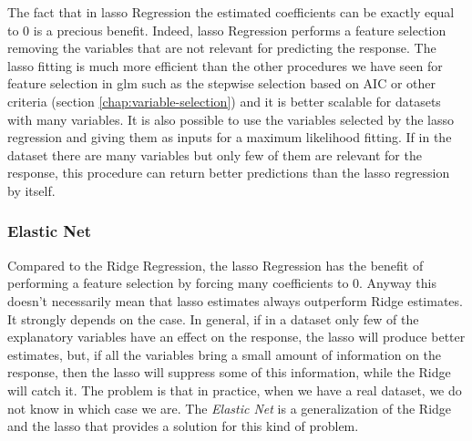 \documentclass[a4paper, twoside, openright, 12pt]{report}
\let\origfigure\figure
\let\endorigfigure\endfigure
\renewenvironment{figure}[1][2] {
  \expandafter\origfigure\expandafter[!hbtp]
} {
  \endorigfigure
}
\theoremstyle{definition}
\theoremstyle{definition}
\theoremstyle{definition}
\theoremstyle{remark}
\begin{document}
\begin{figure}[!hbtp]

{\centering {}

}

\caption[Geometrical interpretation of the optimization problem for Ridge and LASSO.]{Geometrical interpretation of the optimization problem for Ridge and LASSO. The sharpness of the LASSO feasibility region implies that the optimal point \(\hat{\boldsymbol{\beta}}^{LASSO}\) could fall into one of the corners of the square leading one of the coefficients \(\hat{\beta}_j^{LASSO}\) to be exactly equal to \(0\).}\label{fig:opt-ridge-lasso}
\end{figure}

The fact that in \ac{lasso} Regression the estimated coefficients can be exactly equal to \(0\) is a precious benefit. Indeed, \ac{lasso} Regression performs a feature selection removing the variables that are not relevant for predicting the response. The \ac{lasso} fitting is much more efficient than the other procedures we have seen for feature selection in \ac{glm} such as the stepwise selection based on AIC or other criteria (section \ref{chap:variable-selection}) and it is better scalable for datasets with many variables. It is also possible to use the variables selected by the \ac{lasso} regression and giving them as inputs for a maximum likelihood fitting. If in the dataset there are many variables but only few of them are relevant for the response, this procedure can return better predictions than the \ac{lasso} regression by itself.

\hypertarget{elastic-net}{%
\subsubsection{Elastic Net}\label{elastic-net}}

Compared to the Ridge Regression, the \ac{lasso} Regression has the benefit of performing a feature selection by forcing many coefficients to \(0\). Anyway this doesn't necessarily mean that \ac{lasso} estimates always outperform Ridge estimates. It strongly depends on the case. In general, if in a dataset only few of the explanatory variables have an effect on the response, the \ac{lasso} will produce better estimates, but, if all the variables bring a small amount of information on the response, then the \ac{lasso} will suppress some of this information, while the Ridge will catch it. The problem is that in practice, when we have a real dataset, we do not know in which case we are. The \emph{Elastic Net} is a generalization of the Ridge and the \ac{lasso} that provides a solution for this kind of problem.
\end{document}
